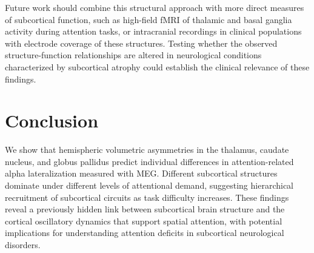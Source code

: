 \documentclass[12pt]{article}
\begin{document}
Future work should combine this structural approach with more direct measures of subcortical function, such as high-field fMRI of thalamic and basal ganglia activity during attention tasks, or intracranial recordings in clinical populations with electrode coverage of these structures. Testing whether the observed structure-function relationships are altered in neurological conditions characterized by subcortical atrophy could establish the clinical relevance of these findings.

\section{Conclusion}

We show that hemispheric volumetric asymmetries in the thalamus, caudate nucleus, and globus pallidus predict individual differences in attention-related alpha lateralization measured with MEG. Different subcortical structures dominate under different levels of attentional demand, suggesting hierarchical recruitment of subcortical circuits as task difficulty increases. These findings reveal a previously hidden link between subcortical brain structure and the cortical oscillatory dynamics that support spatial attention, with potential implications for understanding attention deficits in subcortical neurological disorders.



\end{document}
